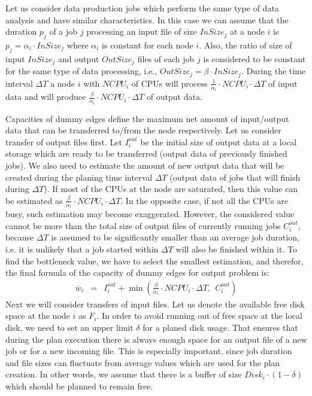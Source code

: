 \documentclass{svjour3}                     %
\begin{document}
Let us consider data production jobs which perform the same type of data analysis and have similar characteristics. In this case we can assume that the duration $p_{j}$ of a job $j$  processing an input
file of size $InSize_{j}$ at a node $i$ is $p_{j} = \alpha_{i} \cdot
InSize_{j}$ where $\alpha_{i}$ is constant for each node $i$.  Also, the ratio of
size of input $InSize_{j}$ and output $OutSize_{j}$ files of each job $j$ is
considered to be constant for the same type of data processing, i.e.,
$OutSize_{j} = \beta \cdot InSize_{j}$.  During the time interval $\Delta T$ a
node $i$ with $NCPU_{i}$  of CPUs  will process $\frac{1}{\alpha_{i}} \cdot
NCPU_{i} \cdot \Delta T$ of input data and will produce
$\frac{\beta}{\alpha_{i}} \cdot NCPU_{i} \cdot \Delta T$ of output data.

Capacities of dummy edges define the maximum net amount of input/output data that can be transferred to/from the node respectively. Let us consider transfer of output files first. Let $I_{i}^{out}$ be the initial size of output data at a local storage which are ready to be transferred (output data of previously finished jobs). We also need to estimate the amount of new output data that will be created during the planing time interval $\Delta T$ (output data of jobs that will finish during $\Delta T$). If most of the CPUs at the node are saturated, then this value can be estimated as $\frac{\beta}{\alpha_{i}} \cdot NCPU_{i} \cdot \Delta T$. In the opposite case, if not all the CPUs are busy, such estimation may become exaggerated. However, the considered value cannot be more than the total size of output files of currently running jobs $C_{i}^{out}$, because $\Delta T$ is assumed to be significantly smaller than an average job duration, i.e. it is unlikely that a job started within $\Delta T$ will also be finished within it. To find the bottleneck value, we have to select the smallest estimation, and therefor, the final formula of the capacity of dummy edges for output problem is:
\begin{eqnarray}
\overline{w}_{i} &=& I_{i}^{out} + \min(\frac{\beta}{\alpha_{i}} \cdot NCPU_{i} \cdot \Delta T,\ \  C_{i}^{out}) \label{sigma}
\end{eqnarray}  
Next we will consider transfers of input files. Let us denote the available free disk space at the node $i$ as $F_{i}$. In order to avoid running out of free space at the local disk, we need to set an upper limit $\delta$ for a planed disk usage. That ensures that during the plan execution there is always enough space for an output file of a new job or for a new incoming file. This is especially important, since job duration and file sizes can fluctuate from average values which are used for the plan creation. In other words, we assume that there is a buffer of size $Disk_{i} \cdot (1 - \delta)$ which should be planned to remain free.
\end{document}
